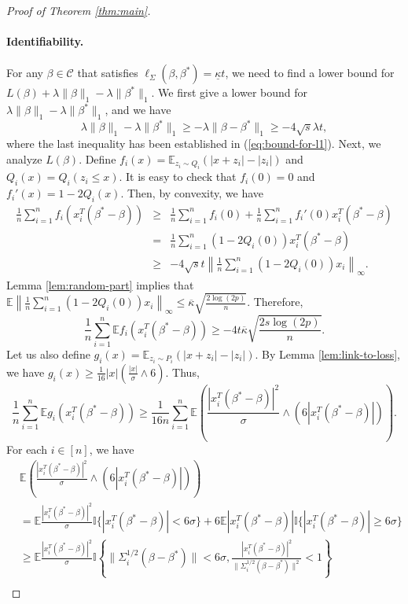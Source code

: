 \begin{proof}[Proof of Theorem \ref{thm:main}]
\paragraph{Identifiability.} For any $\beta\in\mathcal{C}$ that satisfies $\ell_{\Sigma}(\beta,\beta^*)=\underline{\kappa}t$, we need to find a lower bound for $L(\beta)+\lambda\|\beta\|_1-\lambda\|\beta^*\|_1$.
We first give a lower bound for $\lambda\|\beta\|_1-\lambda\|\beta^*\|_1$, and we have
\begin{equation}
\lambda\|\beta\|_1-\lambda\|\beta^*\|_1\geq -\lambda\|\beta-\beta^*\|_1 \geq -4\sqrt{s}\lambda t, \label{eq:pen-easy}
\end{equation}
where the last inequality has been established in (\ref{eq:bound-for-l1}).
Next, we analyze $L(\beta)$.
Define $f_i(x)=\mathbb{E}_{z_i\sim Q_i}(|x+z_i|-|z_i|)$ and $Q_i(x)=Q_i(z_i\leq x)$. It is easy to check that $f_i(0)=0$ and $f_i'(x)=1-2Q_i(x)$. Then, by convexity, we have
\begin{eqnarray*}
\frac{1}{n}\sum_{i=1}^nf_i(x_i^T(\beta^*-\beta)) &\geq& \frac{1}{n}\sum_{i=1}^nf_i(0) + \frac{1}{n}\sum_{i=1}^nf_i'(0)x_i^T(\beta^*-\beta) \\
&=& \frac{1}{n}\sum_{i=1}^n(1-2Q_i(0))x_i^T(\beta^*-\beta) \\
&\geq& -4\sqrt{s}t\left\|\frac{1}{n}\sum_{i=1}^n(1-2Q_i(0))x_i\right\|_{\infty}.
\end{eqnarray*}
Lemma \ref{lem:random-part} implies that $\mathbb{E}\left\|\frac{1}{n}\sum_{i=1}^n(1-2Q_i(0))x_i\right\|_{\infty}\leq \overline{\kappa}\sqrt{\frac{2\log(2p)}{n}}$. Therefore,
$$\frac{1}{n}\sum_{i=1}^n\mathbb{E}f_i(x_i^T(\beta^*-\beta))\geq -4t\overline{\kappa}\sqrt{\frac{2s\log(2p)}{n}}.$$
Let us also define $g_i(x)=\mathbb{E}_{z_i\sim P_i}(|x+z_i|-|z_i|)$. By Lemma \ref{lem:link-to-loss}, we have $g_i(x)\geq \frac{1}{16}|x|\left(\frac{|x|}{\sigma}\wedge 6\right)$. Thus,
$$\frac{1}{n}\sum_{i=1}^n\mathbb{E}g_i(x_i^T(\beta^*-\beta))\geq \frac{1}{16n}\sum_{i=1}^n \mathbb{E}\left(\frac{|x_i^T(\beta^*-\beta)|^2}{\sigma}\wedge (6|x_i^T(\beta^*-\beta)|)\right).$$
For each $i\in[n]$, we have
\begin{align}
\nonumber & \mathbb{E}\left(\frac{|x_i^T(\beta^*-\beta)|^2}{\sigma}\wedge (6|x_i^T(\beta^*-\beta)|)\right) \\
\nonumber &= \mathbb{E}\frac{|x_i^T(\beta^*-\beta)|^2}{\sigma}\mathbb{I}\{|x_i^T(\beta^*-\beta)|< 6\sigma\} + 6\mathbb{E}|x_i^T(\beta^*-\beta)|\mathbb{I}\{|x_i^T(\beta^*-\beta)|\geq 6\sigma\} \\
\nonumber &\geq \mathbb{E}\frac{|x_i^T(\beta^*-\beta)|^2}{\sigma}\mathbb{I}\left\{\|\Sigma_i^{1/2}(\beta-\beta^*)\|< 6\sigma, \frac{|x_i^T(\beta^*-\beta)|^2}{\|\Sigma_i^{1/2}(\beta-\beta^*)\|^2}< 1\right\} \\

\end{align}
\end{proof}
